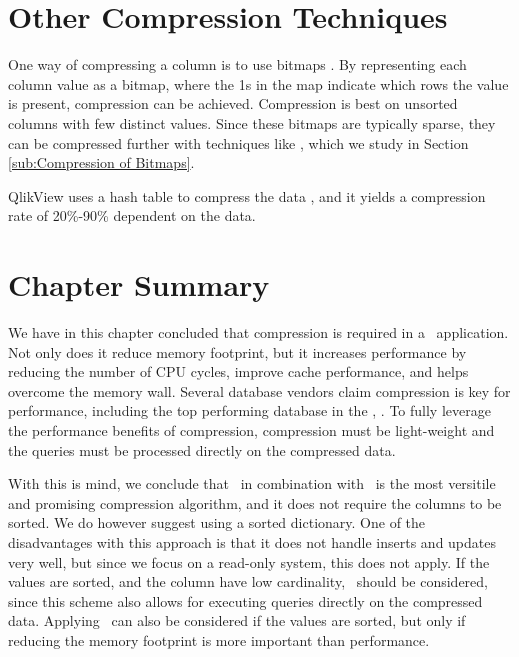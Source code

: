 
\section{Other Compression Techniques}
\label{sec:Other Compression Techniques}
One way of compressing a column is to use bitmaps \cite{Stonebraker2005-qz}. By representing each column value as a bitmap, where the 1s in the map indicate which rows the value is present, compression can be achieved. Compression is best on unsorted columns with few distinct values. Since these bitmaps are typically sparse, they can be compressed further with techniques like \rle, which we study in Section \ref{sub:Compression of Bitmaps}.

QlikView uses a hash table to compress the data \cite{Qlik2014-vd}, and it yields a compression rate of 20\%-90\% dependent on the data.

\section{Chapter Summary}
\label{sec:Chapter Summary}
We have in this chapter concluded that compression is required in a \bd~application. Not only does it reduce memory footprint, but it increases performance by reducing the number of CPU cycles, improve cache performance, and helps overcome the memory wall. Several database vendors claim compression is key for performance, including the top performing database in the \tpch, \exasol. To fully leverage the performance benefits of compression, compression must be light-weight and the queries must be processed directly on the compressed data.

With this is mind, we conclude that \de~in combination with \bp~is the most versitile and promising compression algorithm, and it does not require the columns to be sorted. We do however suggest using a sorted dictionary. One of the disadvantages with this approach is that it does not handle inserts and updates very well, but since we focus on a read-only system, this does not apply. If the values are sorted, and the column have low cardinality, \rle~should be considered, since this scheme also allows for executing queries directly on the compressed data. Applying \dele~can also be considered if the values are sorted, but only if reducing the memory footprint is more important than performance.



